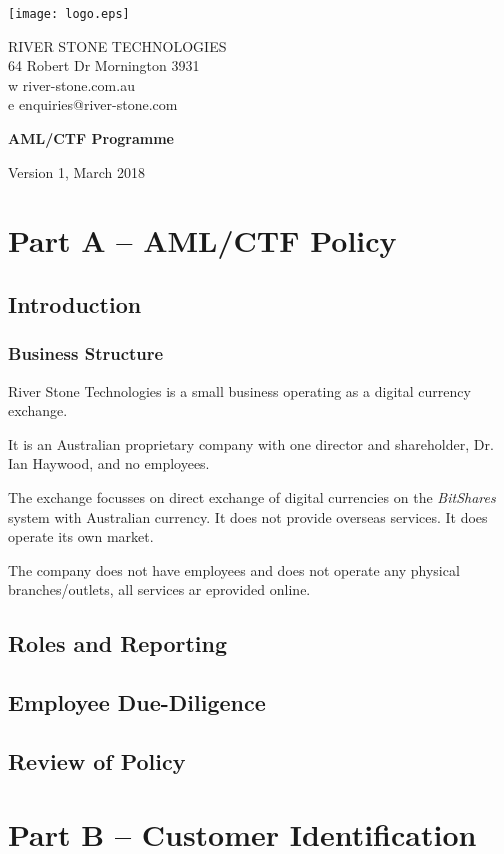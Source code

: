 \documentclass[12pt]{report}
\begin{document}
\texttt{[image: logo.eps]} \parbox[b]{5in}{\sffamily RIVER STONE TECHNOLOGIES \\
  64 Robert Dr Mornington 3931\\ w river-stone.com.au \\ e enquiries@river-stone.com }

\rmfamily
\vspace{1.5in}

\begin{center}
  {\Huge \bfseries AML/CTF Programme}
  \vspace{1in}

  {\large Version 1, March 2018}
 \end{center}
\setcounter{page}{1}                    %



\renewcommand{\thechapter}{A}%
\chapter*{Part A -- AML/CTF Policy}

\section{Introduction}

\subsection{Business Structure}

River Stone Technologies is  a small business operating as a digital currency exchange.

It is an Australian proprietary company with one director and shareholder,
Dr. Ian Haywood, and no employees.

The exchange focusses on direct exchange of digital currencies on
the \emph{BitShares} system with Australian currency. It does
not provide overseas services. It does operate its own market.

The company does not have employees and does not operate any physical
branches/outlets, all services ar eprovided online.

\section{Roles and Reporting}

\section{Employee Due-Diligence}

\section{Review of Policy}

\renewcommand{\thechapter}{B}%
\chapter*{Part B -- Customer Identification}
\end{document}

